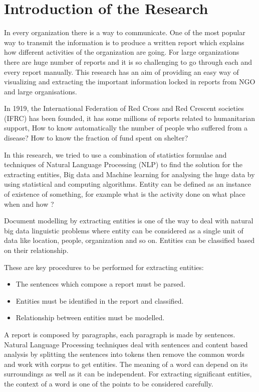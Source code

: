 \chapter{Introduction of the Research}

In every organization there is a way to communicate. One of the most popular way to transmit the information  is  to produce a written report which explains how different activities of the organization are going. For large organizations there are huge number of reports and it is so
challenging to go through  each and every report manually.
This research has an aim of providing an easy way of visualizing and extracting the important information locked in reports from NGO
and large organisations.

In 1919, the International Federation of Red Cross and Red Crescent societies (IFRC) has been founded, it has some millions of reports related to humanitarian support,
How to  know automatically the number of people who suffered from a disease?  How to know the  fraction of fund spent on shelter?  

In this research, we tried to use a combination of statistics formulae  and techniques of Natural Language Processing (NLP) to find the solution for the extracting entities, 
Big data and Machine learning for analysing the huge data by using statistical and computing algorithms.
Entity can be defined as an instance of existence of something, for example what is the activity done on what place when and how ?

Document modelling by extracting entities is one of the way to deal with natural big data linguistic problems where entity can be considered as a single unit of data like location, people, organization and so on. Entities  can be classified based on their relationship.

These are key procedures to be performed for extracting entities: 
\begin{itemize}
\item The sentences which compose a report  must be parsed.
\item Entities must be identified in the report and classified.
\item Relationship between entities must be modelled.
\end{itemize}

A report is composed by
paragraphs, each paragraph is made by sentences. Natural  Language Processing techniques deal with sentences and content based analysis by splitting the sentences into tokens
then remove the common words and work with corpus to get entities.
The meaning of a word can depend on its surroundings as well as it can be independent.
For extracting significant entities, the context of a word is one of the points to be considered carefully.